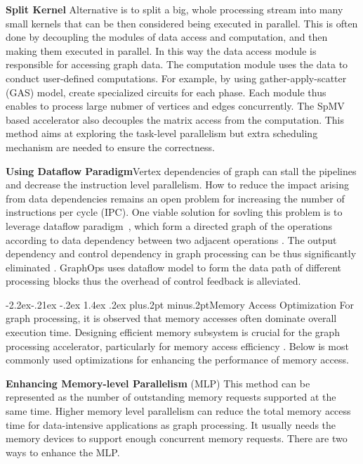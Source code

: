 \documentclass[twoside]{article}
\makeatletter
\def\subsubsection{\@startsection{subsubsection}{3}{\z@}%
 {-2.2ex\@plus -.21ex \@minus -.2ex}%
 {1.4ex \@plus.2ex}
{\normalfont\normalsize\protect\baselineskip=12pt plus.2pt minus.2pt\sl}}
\makeatother
\begin{document}
\begin{multicols}{2}
{\bf Split Kernel} Alternative is to split a big, whole processing stream into many small kernels that can be then considered being executed in parallel. This is often done by decoupling the modules of data access and computation, and then making them executed in parallel. In this way the data access module is responsible for accessing graph data. The computation module uses the data to conduct user-defined computations. 
For example, by using gather-apply-scatter (GAS) model, \cite{ozdal2016energy,zhou2017tunao,attia2014cygraph} create specialized circuits for each phase. Each module thus enables to process large nubmer of vertices and edges concurrently. The SpMV based accelerator \cite{song2016novelspmv} also decouples the matrix access from the computation. This method aims at exploring the task-level parallelism but extra scheduling mechanism are needed to ensure the correctness.

{\bf Using Dataflow Paradigm}\quad Vertex dependencies of graph can stall the pipelines and decrease the instruction level parallelism. How to reduce the impact arising from data dependencies remains an open problem for increasing the number of instructions per cycle (IPC). 
One viable solution for sovling this problem is to leverage dataflow paradigm~\cite{jin2017dataflow,Oguntebi2016graphops}, which form a directed graph of the operations according to data dependency between two adjacent operations \cite{jin2017dataflow}. The output dependency and control dependency in graph processing can be thus significantly eliminated \cite{jin2017dataflow}. GraphOps \cite{Oguntebi2016graphops} uses dataflow model to form the data path of different processing blocks thus the overhead of control feedback is alleviated.

\subsubsection{Memory Access Optimization}
For graph processing, it is observed that memory accesses often dominate overall execution time. Designing efficient memory subsystem is crucial for the graph processing accelerator, particularly for memory access efficiency \cite{ham2016graphicionado, ozdal2016energy}. Below is most commonly used optimizations for enhancing the performance of memory access.

{\bf Enhancing Memory-level Parallelism} (MLP) This method can be represented as the number of outstanding memory requests supported at the same time. Higher memory level parallelism can reduce the total memory access time for data-intensive applications as graph processing. It usually needs the memory devices to support enough concurrent memory requests. There are two ways to enhance the MLP.


\end{multicols}
\end{document}

